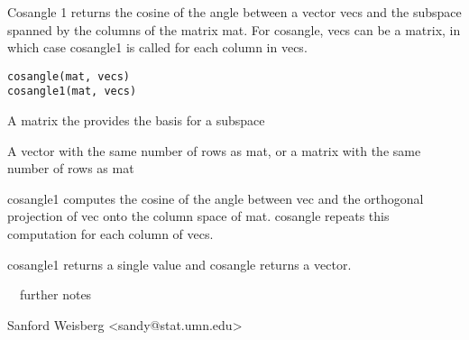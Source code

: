 \begin{Description}\relax
Cosangle 1 returns the cosine of the
angle between a vector vecs  and the subspace spanned
by the columns of the matrix mat.  For cosangle, vecs can be a matrix, in
which case cosangle1 is called for each column in vecs.\end{Description}
\begin{Usage}
\begin{verbatim}
cosangle(mat, vecs)
cosangle1(mat, vecs)
\end{verbatim}
\end{Usage}
\begin{Arguments}
\begin{ldescription}
\item[\code{mat}] A matrix the provides the basis for a subspace
\item[\code{vecs}] A vector with the same number of rows as mat, or a matrix
with the same number of rows as mat
\end{ldescription}
\end{Arguments}
\begin{Details}\relax
cosangle1 computes the cosine of the angle between vec and the orthogonal projection
of vec onto the column space of mat.  cosangle repeats this computation
for each column of vecs.\end{Details}
\begin{Value}
cosangle1 returns a single value and cosangle returns a vector.\end{Value}
\begin{Note}\relax
~~further notes~~\end{Note}
\begin{Author}\relax
Sanford Weisberg <sandy@stat.umn.edu>\end{Author}

